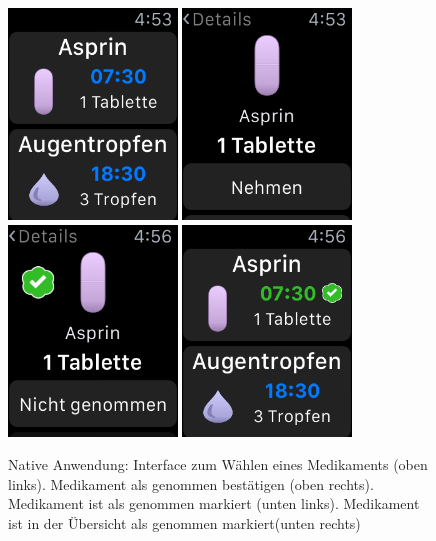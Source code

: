 \begin{figure}
	\caption{Native Anwendung: Interface zum Wählen eines Medikaments (oben links). Medikament als genommen bestätigen (oben rechts). Medikament ist als genommen markiert (unten links). Medikament ist in der Übersicht als genommen markiert(unten rechts)}
	\label{fig:watch-app-take}
	\centering
	\includegraphics[width=0.4\textwidth]{04_realisation/screenshots/watch/notTaken01.png}
	\includegraphics[width=0.4\textwidth]{04_realisation/screenshots/watch/notTaken02.png}
	\includegraphics[width=0.4\textwidth]{04_realisation/screenshots/watch/taken01.png}
	\includegraphics[width=0.4\textwidth]{04_realisation/screenshots/watch/taken02.png}
\end{figure}

